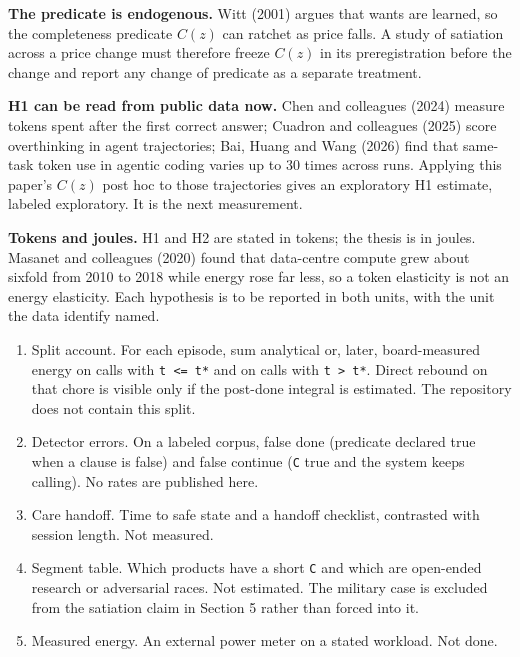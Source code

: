 \documentclass[
  10pt,
]{article}
\providecommand{\tightlist}{%
  \setlength{\itemsep}{0pt}\setlength{\parskip}{0pt}}
\begin{document}
\textbf{The predicate is endogenous.} Witt (2001) argues that wants are
learned, so the completeness predicate \(C(z)\) can ratchet as price
falls. A study of satiation across a price change must therefore freeze
\(C(z)\) in its preregistration before the change and report any change
of predicate as a separate treatment.

\textbf{H1 can be read from public data now.} Chen and colleagues (2024)
measure tokens spent after the first correct answer; Cuadron and
colleagues (2025) score overthinking in agent trajectories; Bai, Huang
and Wang (2026) find that same-task token use in agentic coding varies
up to 30 times across runs. Applying this paper's \(C(z)\) post hoc to
those trajectories gives an exploratory H1 estimate, labeled
exploratory. It is the next measurement.

\textbf{Tokens and joules.} H1 and H2 are stated in tokens; the thesis
is in joules. Masanet and colleagues (2020) found that data-centre
compute grew about sixfold from 2010 to 2018 while energy rose far less,
so a token elasticity is not an energy elasticity. Each hypothesis is to
be reported in both units, with the unit the data identify named.

\begin{enumerate}
\def\labelenumi{\arabic{enumi}.}
\tightlist
\item
  Split account. For each episode, sum analytical or, later,
  board-measured energy on calls with \texttt{t\ \textless{}=\ t*} and
  on calls with \texttt{t\ \textgreater{}\ t*}. Direct rebound on that
  chore is visible only if the post-done integral is estimated. The
  repository does not contain this split.
\item
  Detector errors. On a labeled corpus, false done (predicate declared
  true when a clause is false) and false continue (\texttt{C} true and
  the system keeps calling). No rates are published here.
\item
  Care handoff. Time to safe state and a handoff checklist, contrasted
  with session length. Not measured.
\item
  Segment table. Which products have a short \texttt{C} and which are
  open-ended research or adversarial races. Not estimated. The military
  case is excluded from the satiation claim in Section 5 rather than
  forced into it.
\item
  Measured energy. An external power meter on a stated workload. Not
  done.
\end{enumerate}
\end{document}
